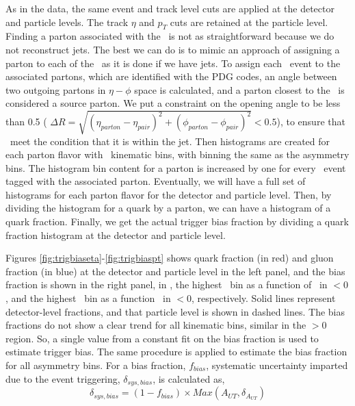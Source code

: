 


As in the data, the same event and track level cuts are applied at the detector and particle levels. The track $\eta$ and $p_T$ cuts are retained at the particle level. Finding a parton associated with the \pip\ is not as straightforward because we do not reconstruct jets. The best we can do is to mimic an approach of assigning a parton to each of the \pip\ as it is done if we have jets. To assign each \pip\ event to the associated partons, which are identified with the PDG codes, an angle between two outgoing partons in $\eta - \phi$ space is calculated, and a parton closest to the \pip\ is considered a source parton. We put a constraint on the opening angle to be less than 0.5 ( $\Delta R = \sqrt{(\eta_{parton} - \eta_{pair})^2 + (\phi_{parton} -\phi_{pair})^2} < 0.5$), to ensure that \pip\ meet the condition that it is within the jet. Then histograms are created for each parton flavor with \pip\  kinematic bins, with binning the same as the asymmetry bins. The histogram bin content for a parton is increased by one for every \pip\ event tagged with the associated parton. Eventually, we will have a full set of histograms for each parton flavor for the detector and particle level. Then, by dividing the histogram for a quark by a parton, we can have a histogram of a quark fraction. Finally, we get the actual trigger bias fraction by dividing a quark fraction histogram at the detector and particle level.     

Figures \ref{fig:trigbiaseta}-\ref{fig:trigbiaspt} shows quark fraction (in red) and gluon fraction (in blue) at the detector and particle level in the left panel, and the bias fraction is shown in the right panel, in \etap, the highest \minv\ bin as a function of \ptp\ in \etap$<0$, and the highest \ptp\ bin as a function \minv\ in \etap$<0$, respectively. Solid lines represent detector-level fractions, and that particle level is shown in dashed lines. The bias fractions do not show a clear trend for all kinematic bins, similar in the \etap$>0$ region. So, a single value from a constant fit on the bias fraction is used to estimate trigger bias. The same procedure is applied to estimate the bias fraction for all asymmetry bins. For a bias fraction, $f_{bias}$, systematic uncertainty imparted due to the event triggering, $\delta_{sys,bias}$, is calculated as, 
\begin{equation}
    \delta_{sys,bias} = (1-f_{bias})\times Max(A_{UT}, \delta_{A_{UT}})
\end{equation}

